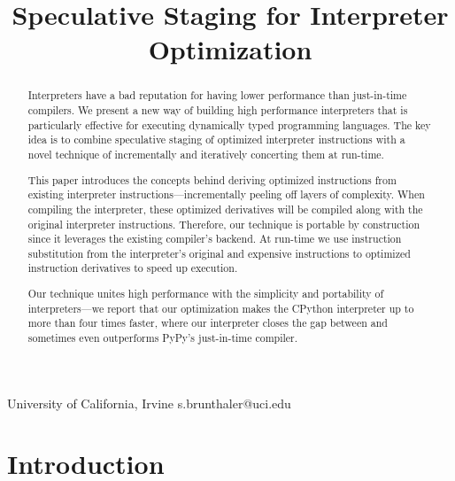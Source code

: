 \documentclass[preprint,10pt]{popl14conf}
\newcommand{\xtitle}{Adaptive Interpreter Optimization using Multi-Level Quickening}
\renewcommand{\xtitle}{Speculative Staging for Interpreter Optimization}
\begin{document}
\title{\xtitle}




           {University of California, Irvine}
           {s.brunthaler@uci.edu}










\maketitle


\begin{abstract}
Interpreters have a bad reputation for having lower performance than just-in-time compilers.
We present a new way of building high performance interpreters that is particularly effective for
executing dynamically typed programming languages.
The key idea is to combine speculative staging of optimized interpreter instructions with a novel
technique of incrementally and iteratively concerting them at run-time.

This paper introduces the concepts behind deriving optimized instructions from existing interpreter
instructions---incrementally peeling off layers of complexity.
When compiling the interpreter, these optimized derivatives will be compiled along with the original
interpreter instructions.
Therefore, our technique is portable by construction since it leverages the existing compiler's
backend.
At run-time we use instruction substitution from the interpreter's original and expensive
instructions to optimized instruction derivatives to speed up execution.

Our technique unites high performance with the simplicity and portability of interpreters---we
report that our optimization makes the CPython interpreter up to more than four times faster, where
our interpreter closes the gap between and sometimes even outperforms PyPy's just-in-time compiler.
\end{abstract}







\section{Introduction}\label{s:intro}
\end{document}
